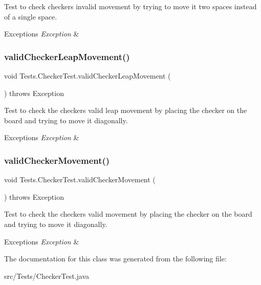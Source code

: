 Test to check checker\textquotesingle{}s invalid movement by trying to move it two spaces instead of a single space. 
\begin{DoxyExceptions}{Exceptions}
{\em Exception} & \\
\hline
\end{DoxyExceptions}
\hypertarget{class_tests_1_1_checker_test_a35af29acb3ae72737413763ace0f911e}{}\label{class_tests_1_1_checker_test_a35af29acb3ae72737413763ace0f911e} 
\subsubsection{\texorpdfstring{valid\+Checker\+Leap\+Movement()}{validCheckerLeapMovement()}}
{\footnotesize\ttfamily void Tests.\+Checker\+Test.\+valid\+Checker\+Leap\+Movement (\begin{DoxyParamCaption}{ }\end{DoxyParamCaption}) throws Exception}

Test to check the checker\textquotesingle{}s valid leap movement by placing the checker on the board and trying to move it diagonally. 
\begin{DoxyExceptions}{Exceptions}
{\em Exception} & \\
\hline
\end{DoxyExceptions}
\hypertarget{class_tests_1_1_checker_test_a93db61a292d48963a5ab97e349c910c3}{}\label{class_tests_1_1_checker_test_a93db61a292d48963a5ab97e349c910c3} 
\subsubsection{\texorpdfstring{valid\+Checker\+Movement()}{validCheckerMovement()}}
{\footnotesize\ttfamily void Tests.\+Checker\+Test.\+valid\+Checker\+Movement (\begin{DoxyParamCaption}{ }\end{DoxyParamCaption}) throws Exception}

Test to check the checker\textquotesingle{}s valid movement by placing the checker on the board and trying to move it diagonally. 
\begin{DoxyExceptions}{Exceptions}
{\em Exception} & \\
\hline
\end{DoxyExceptions}


The documentation for this class was generated from the following file\+:\begin{DoxyCompactItemize}
\item 
src/\+Tests/Checker\+Test.\+java\end{DoxyCompactItemize}

